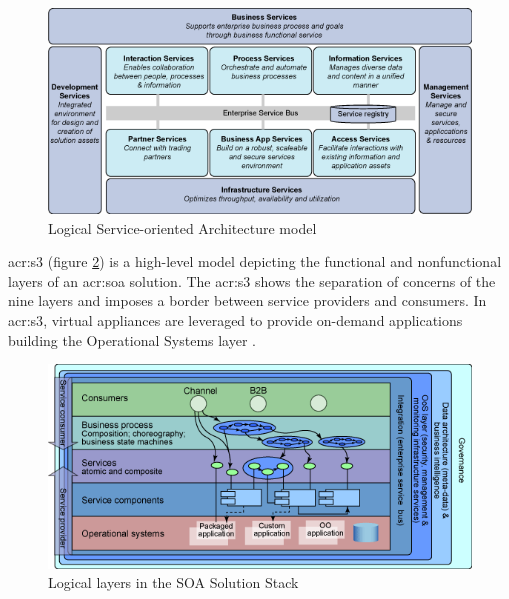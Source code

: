 \documentclass[11pt]{book}
\begin{document}
        \begin{figure}[h]
          \begin{center}
            \includegraphics[scale=.5]{img/ctx/soa-logical.png}
          \end{center}

          \caption{Logical Service-oriented Architecture model}
          \label{fig:ctx:soa-logical}
        \end{figure}

        \gls{acr:s3} (figure \ref{fig:ctx:soa-stack}) is a high-level model depicting the functional and nonfunctional
        layers of an \gls{acr:soa} solution.  The \gls{acr:s3} shows the separation of concerns of the nine layers and
        imposes a border between service providers and consumers. In \gls{acr:s3}, virtual appliances are leveraged to
        provide on-demand applications building the Operational Systems layer \cite{soa-stack}.

        \begin{figure}[h]
          \begin{center}
            \includegraphics[scale=.5]{img/ctx/soa-stack.png}
          \end{center}

          \caption{Logical layers in the SOA Solution Stack}
          \label{fig:ctx:soa-stack}
        \end{figure}
\end{document}
